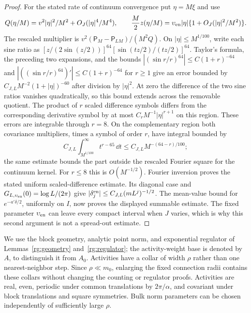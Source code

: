 \begin{proof}
For the stated rate of continuum convergence put $\eta=M\xi$ and
use
\[
 Q(\eta/M)=v^2|\eta|^2/M^2+O_J(|\eta|^4/M^4),\qquad
 \frac M2z(\eta/M)=\upsilon_{\rm en}|\eta|
                \{1+O_J(|\eta|^2/M^2)\}.
\]
The rescaled multiplier is
$v^2(\mathsf P_M-\mathsf P_{LM})/(M^2Q)$.
On $|\eta|\le M^{1/100}$, write each sine ratio as
$[z/(2\sin(z/2))]^{64}[\sin(tz/2)/(tz/2)]^{64}$.
Taylor's formula, the preceding two expansions, and the bounds
$|(\sin r/r)^{64}|\le C(1+r)^{-64}$ and
$|((\sin r/r)^{64})'|\le C(1+r)^{-64}$ for $r\ge1$
give an error bounded by
$C_{J,L}M^{-2}(1+|\eta|)^{-60}$ after division by $|\eta|^2$.
At zero the difference of the two sine ratios vanishes quadratically,
so this bound extends across the removable quotient.  The product of
$r$ scaled difference symbols differs from the corresponding
derivative symbol by at most
$C_rM^{-1}|\eta|^{r+1}$ on this region.  These errors are integrable
through $r=8$.  On the complementary region both covariance
multipliers, times a symbol of order $r$, have integral bounded by
\[
 C_{J,L}\int_{M^{1/100}}^\infty t^{r-65}\,\dd t
 \le C_{J,L}M^{-(64-r)/100};
\]
the same estimate bounds the part outside the rescaled Fourier
square for the continuum kernel.  For $r\le8$ this is
$O(M^{-1/2})$.  Fourier inversion proves the stated uniform
scaled-difference estimate.  Its diagonal case and
$G_{L,\upsilon_{\rm en}}(0)=\log L/(2\pi)$ give
$|\delta_j^{\rm en}|\le C_{J,L}(mL^j)^{-1/2}$.
The mean-value bound for $e^{-a'\delta/2}$, uniformly on $I$,
now proves the displayed summable estimate.  The fixed parameter
$\upsilon_{\rm en}$ can leave every compact interval when $J$
varies, which is why this second argument is not a spread-out
estimate.
\end{proof}

We use the block geometry, analytic point norm, and exponential regulator
of Lemmas~\ref{rg:geometry} and~\ref{rg:regulator}; the activity-weight
base is denoted by $A$, to distinguish it from $A_0$.  Activities have a
collar of width $\rho$ rather than one nearest-neighbor step.  Since
$\rho\ll m_0$, enlarging the fixed connection radii contains these
collars without changing the counting or regulator proofs.  Activities
are real, even, periodic under common translations by $2\pi/\alpha$,
and covariant under block translations and square symmetries.  Bulk norm
parameters can be chosen independently of sufficiently large $\rho$.

